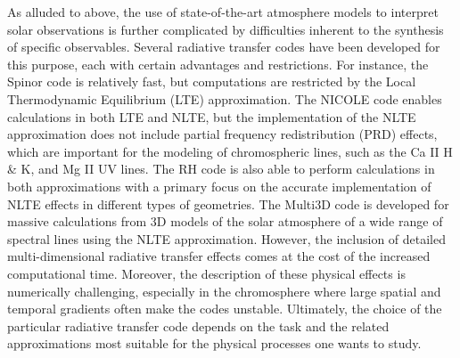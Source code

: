 \documentclass[]{article}
\begin{document}
 
 As alluded to above, the use of state-of-the-art atmosphere models to interpret solar observations is further complicated by difficulties inherent to the synthesis of specific observables.  %
Several radiative transfer codes have been developed for this purpose, each with certain advantages and restrictions. For instance, the Spinor \citep{Frutiger2000} code is relatively fast, but computations are restricted by the Local Thermodynamic Equilibrium (LTE) approximation. The NICOLE code \citep{SocasNavarro2015} enables calculations in both LTE and NLTE, but the implementation of the NLTE approximation does not include partial frequency redistribution (PRD) effects, which are important for the modeling of chromospheric lines, such as the Ca II H \& K, and Mg II UV lines. The RH code \citep{Pereira2015} is also able to perform calculations in both approximations with a primary focus on the accurate implementation of NLTE effects in different types of geometries. The Multi3D code \citep{Leenaarts2009} is developed for massive calculations from 3D models of the solar atmosphere of a wide range of spectral lines using the NLTE approximation. However, the inclusion of detailed multi-dimensional radiative transfer effects comes at the cost of the increased computational time.  Moreover, the description of these physical effects is numerically challenging, especially in the chromosphere where large spatial and temporal gradients often make the codes unstable. Ultimately, the choice of the particular radiative transfer code depends on the task and the related approximations most suitable for the physical processes one wants to study. 
\end{document}
